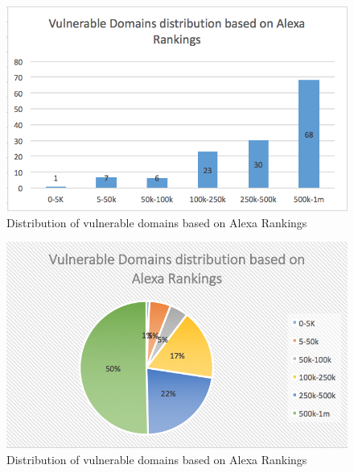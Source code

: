 
\begin{figure}
	\centering
	\includegraphics[width=.5\textwidth]{alexa_data_bar}
	\caption{Distribution of vulnerable domains based on Alexa Rankings}
	\label{fig:alexa_data_bar}
\end{figure}

\begin{figure}
	\centering
	\includegraphics[width=.5\textwidth]{alexa_data_pie}
	\caption{Distribution of vulnerable domains based on Alexa Rankings}
	\label{fig:alexa_data_pie}
\end{figure}
